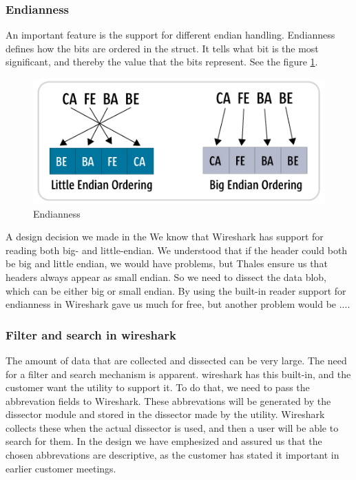 

\subsubsection{Endianness}
An important feature is the support for different endian handling. Endianness defines how the bits are ordered in the struct. It tells what bit is the most significant, and thereby the value that the bits represent. See the figure \ref{fig:endianness}.

\begin{figure}[!htb]
	\includegraphics[width=\textwidth]{./sprints/img/endianness}
	\caption{Endianness\label{fig:endianness}}
\end{figure}

A design decision we made in the 
We know that Wireshark has support for reading both big- and little-endian. We understood that if the header could both be big and little endian, we would have problems, but Thales ensure us that headers always appear as small endian. So we need to dissect the data blob, which can be either big or small endian. By using the built-in reader support for endianness in Wireshark gave us much for free, but another problem would be .... 


\subsubsection{Filter and search in \Gls{wireshark}}
The amount of data that are collected and dissected can be very large. The need for a filter and search mechanism is apparent. \Gls{wireshark} has this built-in, and the customer want the \gls{utility} to support it. To do that, we need to pass the abbrevation fields to Wireshark. These abbrevations will be generated by the dissector module and stored in the dissector made by the utility. Wireshark collects these when the actual dissector is used, and then a user will be able to search for them. In the design we have emphesized and assured us that the chosen abbrevations are descriptive, as the customer has stated it important in earlier customer meetings. 


